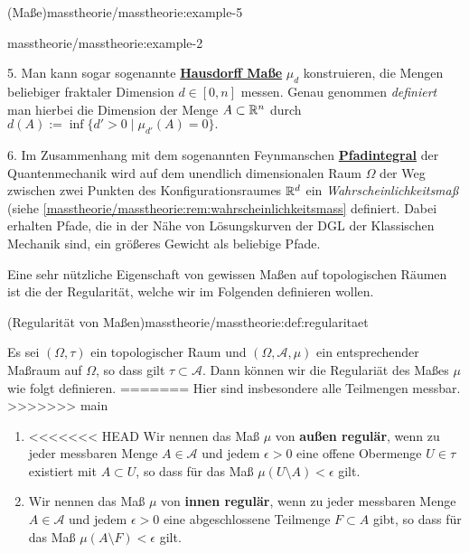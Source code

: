 \begin{example}{(Maße)}{masstheorie/masstheorie:example-5}
\begin{example}{}{masstheorie/masstheorie:example-2}
\par
5. Man kann sogar sogenannte \href{https://de.wikipedia.org/wiki/Hausdorff-Ma\%c3\%9f}{\textbf{Hausdorff Maße}} \(\mu_d\) konstruieren, die Mengen beliebiger fraktaler Dimension \(d\in[0,n]\) messen.
Genau genommen \emph{definiert} man hierbei die Dimension der Menge \(A\subset \mathbb{R}^n\) durch \(d(A):=\inf\{d'>0\mid \mu_{d'}(A)=0\}.\)

\par
6. Im Zusammenhang mit dem sogenannten Feynmanschen \href{https://de.wikipedia.org/wiki/Pfadintegral}{\textbf{Pfadintegral}} der Quantenmechanik wird auf dem unendlich dimensionalen Raum \(\Omega\) der Weg zwischen zwei Punkten des Konfigurationsraumes \(\mathbb{R}^d\) ein \emph{Wahrscheinlichkeitsmaß} (siehe \cref{masstheorie/masstheorie:rem:wahrscheinlichkeitsmass}  definiert.
Dabei erhalten Pfade, die in der Nähe von Lösungskurven der DGL der Klassischen Mechanik sind, ein größeres Gewicht als beliebige Pfade.
\end{example}

\par
Eine sehr nützliche Eigenschaft von gewissen Maßen auf topologischen Räumen ist die der Regularität, welche wir im Folgenden definieren wollen.
\begin{definition}{(Regularität von Maßen)}{masstheorie/masstheorie:def:regularitaet}



\par
Es sei \((\Omega, \tau)\) ein topologischer Raum und \((\Omega, \mathcal{A}, \mu)\) ein entsprechender Maßraum auf \(\Omega\), so dass gilt \(\tau \subset \mathcal{A}\).
Dann können wir die Regulariät des Maßes \(\mu\) wie folgt definieren.
=======
Hier sind insbesondere alle Teilmengen messbar.
>>>>>>> main
\begin{enumerate}

\item {} 
\par
<<<<<<< HEAD
Wir nennen das Maß \(\mu\) von \textbf{außen regulär}, wenn zu jeder messbaren Menge \(A \in \mathcal{A}\) und jedem \(\epsilon > 0\) eine offene Obermenge \(U \in \tau\) existiert mit \(A \subset U\), so dass für das Maß \(\mu(U\setminus A) < \epsilon\) gilt.

\item {} 
\par
Wir nennen das Maß \(\mu\) von \textbf{innen regulär}, wenn zu jeder messbaren Menge \(A \in \mathcal{A}\) und jedem \(\epsilon > 0\) eine abgeschlossene Teilmenge \(F \subset A\) gibt, so dass für das Maß \(\mu(A\setminus F) < \epsilon\) gilt.


\end{enumerate}
\end{definition}
\end{example}
